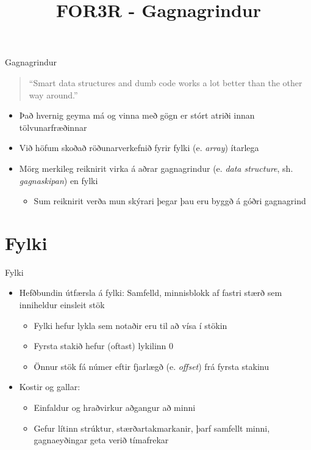 \documentclass{beamer}
\title{FOR3R - Gagnagrindur}
\begin{document}
\begin{frame}
\titlepage
\end{frame}

\begin{frame}{Gagnagrindur}

\begin{quote}
``Smart data structures and dumb code works a lot better than the other way around.''
\end{quote}

\begin{itemize}
 \item Það hvernig geyma má og vinna með gögn er stórt atriði innan tölvunarfræðinnar
 \item Við höfum skoðað röðunarverkefnið fyrir fylki (e. \emph{array}) ítarlega
 \item Mörg merkileg reiknirit virka á aðrar gagnagrindur (e. \emph{data structure}, sh. \emph{gagnaskipan}) en fylki
 \begin{itemize}
  \item Sum reiknirit verða mun skýrari þegar þau eru byggð á góðri gagnagrind
 \end{itemize}
\end{itemize}
\end{frame}

\section{Fylki}
\begin{frame}{Fylki}
\begin{itemize}
 \item Hefðbundin útfærsla á fylki: Samfelld, minnisblokk af fastri stærð sem inniheldur einsleit stök
 \begin{itemize}
  \item Fylki hefur lykla sem notaðir eru til að vísa í stökin
  \item Fyrsta stakið hefur (oftast) lykilinn 0
  \item Önnur stök fá númer eftir fjarlægð (e. \emph{offset}) frá fyrsta stakinu
 \end{itemize}
 \item Kostir og gallar:
 \begin{itemize}
  \item Einfaldur og hraðvirkur aðgangur að minni
  \item Gefur lítinn strúktur, stærðartakmarkanir, þarf samfellt minni, gagnaeyðingar geta verið tímafrekar
 \end{itemize}
\end{itemize}
\end{frame}
\end{document}
